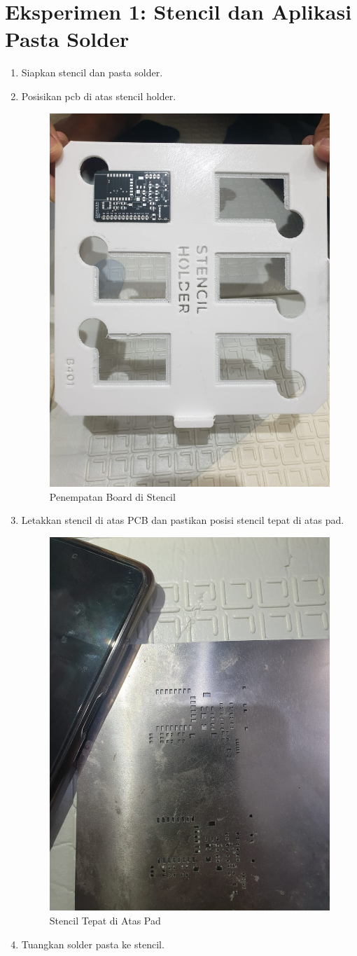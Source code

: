 \section{Eksperimen 1: Stencil dan Aplikasi Pasta Solder}
\begin{enumerate}
    \item Siapkan stencil dan pasta solder.
    \item Posisikan pcb di atas stencil holder.
    \begin{figure}[H]
        \centering
        \includegraphics[width=0.4\linewidth]{P4/img/1_board_minsys_ke_holder_stencil.jpeg}
        \caption{Penempatan Board di Stencil}
        \label{fig:PenempatanBoarddiStencil}
    \end{figure}
    \item Letakkan stencil di atas PCB dan pastikan posisi stencil tepat di atas pad.
    \begin{figure}[H]
        \centering
        \includegraphics[width=0.4\linewidth]{P4/img/2_pastikan_stencil_pas.jpeg}
        \caption{Stencil Tepat di Atas Pad}
        \label{fig:StencilTepatdiAtasPad}
    \end{figure}
    \item Tuangkan solder pasta ke stencil.

\end{enumerate}
